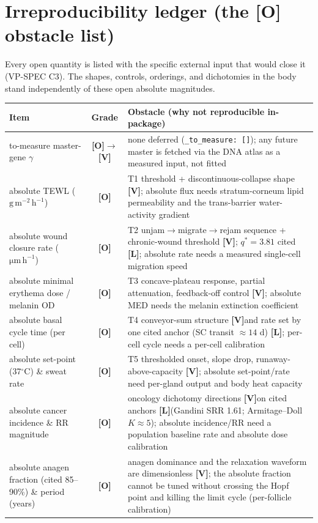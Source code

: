 \documentclass[11pt,a4paper]{article}
\newcommand{\V}{\textcolor{gV}{\textbf{[V]}}}
\newcommand{\Lg}{\textcolor{gL}{\textbf{[L]}}}
\newcommand{\Og}{\textcolor{gO}{\textbf{[O]}}}
\newcommand{\apx}{\ensuremath{\approx}}
\newcommand{\dg}{\ensuremath{^{\circ}}}
\newcommand{\tewlunit}{\ensuremath{\mathrm{g\,m^{-2}\,h^{-1}}}}
\begin{document}
\section{Irreproducibility ledger (the \texorpdfstring{\Og}{[O]} obstacle list)}\label{app:irrepro}

Every open quantity is listed with the specific external input that would close it (VP-SPEC C3). The shapes,
controls, orderings, and dichotomies in the body stand independently of these open absolute magnitudes.

\begin{longtable}{p{4.6cm} c p{8.6cm}}
\toprule
\textbf{Item} & \textbf{Grade} & \textbf{Obstacle (why not reproducible in-package)}\\
\midrule
\endhead
to-measure master-gene $\gamma$ & \Og$\to$\V & none deferred (\texttt{\_to\_measure: []}); any future master is fetched via the DNA atlas as a measured input, not fitted\\
absolute TEWL (\tewlunit) & \Og & T1 threshold + discontinuous-collapse shape \V; absolute flux needs stratum-corneum lipid permeability and the trans-barrier water-activity gradient\\
absolute wound closure rate (\ensuremath{\mathrm{\mu m\,h^{-1}}}) & \Og & T2 unjam$\to$migrate$\to$rejam sequence + chronic-wound threshold \V; $q^{*}=3.81$ cited \Lg; absolute rate needs a measured single-cell migration speed\\
absolute minimal erythema dose / melanin OD & \Og & T3 concave-plateau response, partial attenuation, feedback-off control \V; absolute MED needs the melanin extinction coefficient\\
absolute basal cycle time (per cell) & \Og & T4 conveyor-sum structure \V and rate set by one cited anchor (SC transit $\apx 14$ d) \Lg; per-cell cycle needs a per-cell calibration\\
absolute set-point (37\dg C) \& sweat rate & \Og & T5 thresholded onset, slope drop, runaway-above-capacity \V; absolute set-point/rate need per-gland output and body heat capacity\\
absolute cancer incidence \& RR magnitude & \Og & oncology dichotomy directions \V on cited anchors \Lg (Gandini SRR 1.61; Armitage--Doll $K\apx5$); absolute incidence/RR need a population baseline rate and absolute dose calibration\\
absolute anagen fraction (cited 85--90\%) \& period (years) & \Og & anagen dominance and the relaxation waveform are dimensionless \V; the absolute fraction cannot be tuned without crossing the Hopf point and killing the limit cycle (per-follicle calibration)\\

\end{longtable}
\end{document}
